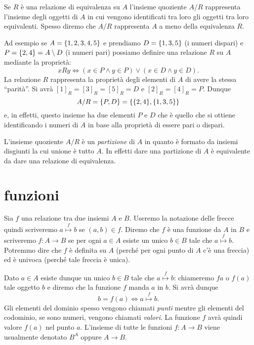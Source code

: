 Se $R$ è una relazione di equivalenza su $A$ 
l'insieme quoziente $A/R$ rappresenta l'insieme 
degli oggetti di $A$ in cui vengono identificati tra loro gli oggetti tra loro 
equivalenti.
Spesso diremo che $A/R$ rappresenta $A$ a meno della equivalenza $R$.

Ad esempio se $A={\left\{ 1,2,3,4,5 \right\}}$ e prendiamo $D={\left\{ 1,3,5 \right\}}$ (i numeri dispari)
e $P={\left\{ 2,4 \right\}}=A\setminus D$ 
(i numeri pari) possiamo definire una relazione $R$ su $A$ mediante la proprietà:
\[
 x R  y \iff (x\in P \land y\in P) \lor (x\in D \land y\in D).
\]
La relazione $R$ rappresenta la proprietà degli elementi di $A$ 
di avere la stessa ``parità''. 
Si avrà $[1]_R = [3]_R=[5]_R= D$ e $[2]_R=[4]_R=P$.
Dunque 
\[
   A/R = {\left\{ P,D \right\}} = {\left\{ {\left\{ 2,4 \right\}},{\left\{ 1,3,5 \right\}} \right\}}
\]
e, in effetti, questo insieme ha due elementi $P$ e $D$ che è quello 
che si ottiene identificando i numeri di $A$ in base alla proprietà 
di essere pari o dispari. 

L'insieme quoziente $A/R$ è un \emph{partizione}%
%
 di $A$ in quanto 
è formato da insiemi disgiunti la cui unione è tutto $A$. In effetti 
dare una partizione di $A$ è equivalente da dare una relazione 
di equivalenza.

\section{funzioni}

Sia $f$ una relazione tra due insiemi $A$ e $B$. 
Useremo la notazione delle frecce quindi scriveremo $a\stackrel f\mapsto b$ 
se $(a,b)\in f$. 
Diremo che $f$ è una funzione da $A$ in $B$ e scriveremo 
$f\colon A\to B$ se per ogni $a\in A$ esiste un unico $b\in B$ 
tale che $a \stackrel f \mapsto b$.
Potremmo dire che $f$ è definita su $A$ 
(perché per ogni punto di $A$ c'è una freccia)
ed è univoca (perché tale freccia è unica).

Dato $a\in A$ esiste dunque un unico $b\in B$ tale che
$a\stackrel f \mapsto b$: chiameremo $fa$
o $f(a)$ 
%
tale oggetto $b$
e diremo che la funzione $f$ manda $a$ in $b$. 
Si avrà dunque
\[
 b=f(a) \iff a\stackrel f \mapsto b.
\]
Gli elementi del dominio spesso vengono chiamati \emph{punti}
mentre gli elementi del codominio, se sono numeri, vengono 
chiamati \emph{valori}. 
La funzione $f$ avrà quindi valore $f(a)$ nel punto $a$.
L'insieme di tutte le funzioni $f\colon A\to B$ viene usualmente denotato $B^A$
oppure $A\to B$.
%
%
%
%

